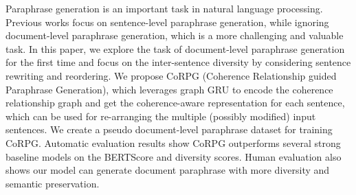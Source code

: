 Paraphrase generation is an important task in natural language processing. Previous works focus on sentence-level paraphrase generation, while ignoring document-level paraphrase generation, which is a more challenging and valuable task. In this paper, we explore the task of document-level paraphrase generation for the first time and focus on the inter-sentence diversity by considering sentence rewriting and reordering. We propose CoRPG (Coherence Relationship guided Paraphrase Generation), which leverages graph GRU to encode the coherence relationship graph and get the coherence-aware representation for each sentence, which can be used for re-arranging the multiple (possibly modified) input sentences. We create a pseudo document-level paraphrase dataset for training CoRPG. Automatic evaluation results show CoRPG outperforms several strong baseline models on the BERTScore and diversity scores. Human evaluation also shows our model can generate document paraphrase with more diversity and semantic preservation.
